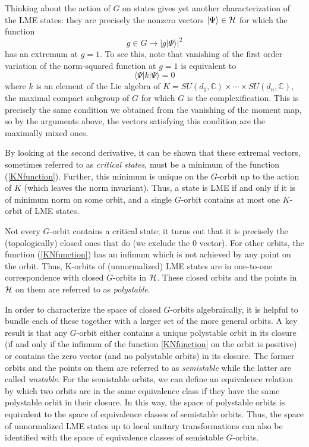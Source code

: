 \documentclass[12pt]{article}
\theoremstyle{definition}
\newcommand{\be}{\begin{equation}}
\newcommand{\ee}{\end{equation}}
\begin{document}
Thinking about the action of $G$ on states gives yet another characterization of the LME states: they are precisely the nonzero vectors $|\Psi \rangle \in {\cal H}$ for which the function
\be
\label{KNfunction}
g \in G \to |g |\Psi \rangle|^2
\ee
has an extremum at $g=1$. To see this, note that vanishing of the first order variation of the norm-squared function at $g=1$ is equivalent to
\be
\langle \Psi| k |\Psi \rangle = 0
\ee
where $k$ is an element of the Lie algebra of $K = SU(d_1,\mathbb{C}) \times \cdots \times SU(d_n, \mathbb{C})$, the maximal compact subgroup of $G$ for which $G$ is the complexification. This is precisely the same condition we obtained from the vanishing of the moment map, so by the arguments above, the vectors satisfying this condition are the maximally mixed ones.

By looking at the second derivative, it can be shown that these extremal vectors, sometimes referred to as {\it critical states}, must be a minimum of the function (\ref{KNfunction}).  Further, this minimum is unique on the $G$-orbit up to the action of $K$ (which leaves the norm invariant). Thus, a state is LME if and only if it is of minimum norm on some orbit, and a single $G$-orbit contains at most one $K$-orbit of LME states.

Not every $G$-orbit contains a critical state; it turns out that it is precisely the (topologically) closed ones that do (we exclude the 0 vector). For other orbits, the function (\ref{KNfunction}) has an infimum which is not achieved by any point on the orbit. Thus, K-orbits of (unnormalized) LME states are in one-to-one correspondence with closed $G$-orbits in ${\cal H}$. These closed orbits and the points in ${\cal H}$ on them are referred to as {\it polystable}.

In order to characterize the space of closed $G$-orbits algebraically, it is helpful to bundle each of these together with a larger set of the more general orbits. A key result is that any $G$-orbit either contains a unique polystable orbit in its closure (if and only if the infimum of the function \ref{KNfunction} on the orbit is positive) or contains the zero vector (and no polystable orbits) in its closure. The former orbits and the points on them are referred to as {\it semistable} while the latter are called {\it unstable}. For the semistable orbits, we can define an equivalence relation by which two orbits are in the same equivalence class if they have the same polystable orbit in their closure. In this way, the space of polystable orbits is equivalent to the space of equivalence classes of semistable orbits. Thus, the space of unnormalized LME states up to local unitary transformations can also be identified with the space of equivalence classes of semistable $G$-orbits.
\end{document}
